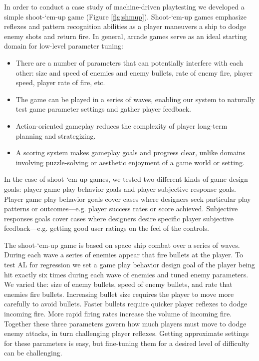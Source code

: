 \documentclass{sig-alternate}
\begin{document}
In order to conduct a case study of machine-driven playtesting we developed a simple shoot-`em-up game (Figure \ref{fig:shmup}).
Shoot-`em-up games emphasize reflexes and pattern recognition abilities as a player maneuvers a ship to dodge enemy shots and return fire.
%
In general, arcade games serve as an ideal starting domain for low-level parameter tuning:
\begin{itemize}
\item There are a number of parameters that can potentially interfere with each other: size and speed of enemies and enemy bullets, rate of enemy fire, player speed, player rate of fire, etc.
\item The game can be played in a series of waves, enabling our system to naturally test game parameter settings and gather player feedback.
\item Action-oriented gameplay reduces the complexity of player long-term planning and strategizing.
\item A scoring system makes gameplay goals and progress clear, unlike domains involving puzzle-solving or aesthetic enjoyment of a game world or setting.
\end{itemize}
%
In the case of shoot-`em-up games, we tested two different kinds of game design goals: player game play behavior goals and player subjective response goals.
Player game play behavior goals cover cases where designers seek particular play patterns or outcomes---e.g. player success rates or score achieved. 
Subjective responses goals cover cases where designers desire specific player subjective feedback---e.g. getting good user ratings on the feel of the controls.


The shoot-`em-up game is based on space ship combat over a series of waves.
During each wave a series of enemies appear that fire bullets at the player. 
To test AL for regression we set a game play behavior design goal of the player being hit exactly six times during each wave of enemies and tuned enemy parameters.
We varied the: size of enemy bullets, speed of enemy bullets, and rate that enemies fire bullets. 
Increasing bullet size requires the player to move more carefully to avoid bullets. 
Faster bullets require quicker player reflexes to dodge incoming fire. 
More rapid firing rates increase the volume of incoming fire. 
Together these three parameters govern how much players must move to dodge enemy attacks, in turn challenging player reflexes. 
Getting approximate settings for these parameters is easy, but fine-tuning them for a desired level of difficulty can be challenging. 
\end{document}
